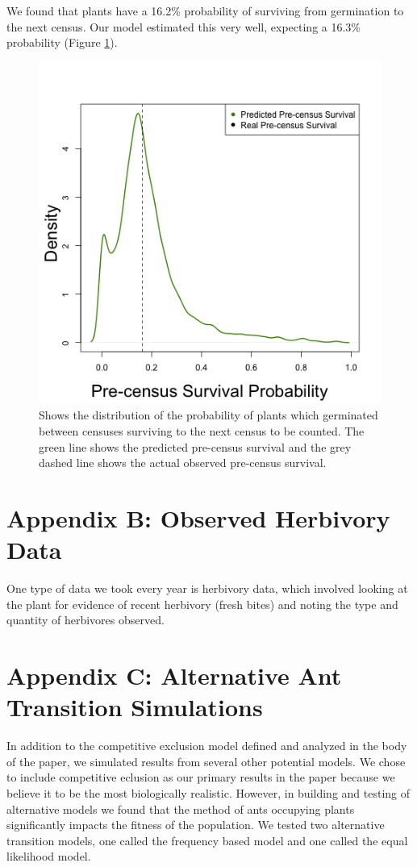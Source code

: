 \documentclass[11pt]{article}
\begin{document}
We found that plants have a 16.2\% probability of surviving from germination to the next census.
Our model estimated this very well, expecting a 16.3\% probability (Figure \ref{app:AppA_Pre_Census_Surv}).

\begin{figure}
	\includegraphics[width=0.91\linewidth]{Figures/seed_surv.png}
	\caption{Shows the distribution of the probability of plants which germinated between censuses surviving to the next census to be counted. The green line shows the predicted pre-census survival and the grey dashed line shows the actual observed pre-census survival.  }
	\label{app:AppA_Pre_Census_Surv}
\end{figure}

\section*{Appendix B: Observed Herbivory Data}
One type of data we took every year is herbivory data, which involved looking at the plant for evidence of recent herbivory (fresh bites) and noting the type and quantity of herbivores observed.


\section*{Appendix C: Alternative Ant Transition Simulations}
In addition to the competitive exclusion model defined and analyzed in the body of the paper, we simulated results from several other potential models. 
We chose to include competitive eclusion as our primary results in the paper because we believe it to be the most biologically realistic.
However, in building and testing of alternative models we found that the method of ants occupying plants significantly impacts the fitness of the population. 
We tested two alternative transition models, one called the frequency based model and one called the equal likelihood model. 
\end{document}
